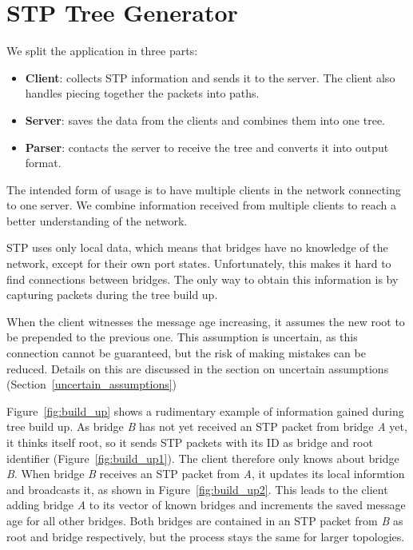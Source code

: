 \chapter{STP Tree Generator}
\label{stp-gen}
We split the application in three parts:
\begin{itemize}
    \item \textbf{Client}: collects STP information and sends it to the server.
        The client also handles piecing together the packets into paths.
    \item \textbf{Server}: saves the data from the clients and combines them into one tree.
    \item \textbf{Parser}: contacts the server to receive the tree and converts it into output format.
\end{itemize}
The intended form of usage is to have multiple clients in the network connecting to one server.
We combine information received from multiple clients to reach a better understanding of the network.

STP uses only local data, which means that bridges have no knowledge of the network, except for their own port states.
Unfortunately, this makes it hard to find connections between bridges.
The only way to obtain this information is by capturing packets during the tree build up.

When the client witnesses the message age increasing, it assumes the new root to be prepended to the previous one.
This assumption is uncertain, as this connection cannot be guaranteed, but the risk of making mistakes can be reduced.
Details on this are discussed in the section on uncertain assumptions (Section~\ref{uncertain_assumptions})

Figure~\ref{fig:build_up} shows a rudimentary example of information gained during tree build up.
As bridge \textit{B} has not yet received an STP packet from bridge \textit{A} yet, it thinks itself root, so it sends STP packets with its ID as bridge and root identifier (Figure~\ref{fig:build_up1}).
The client therefore only knows about bridge \textit{B}.
When bridge \textit{B} receives an STP packet from \textit{A}, it updates its local informtion and broadcasts it, as shown in Figure~\ref{fig:build_up2}.
This leads to the client adding bridge \textit{A} to its vector of known bridges and increments the saved message age for all other bridges.
Both bridges are contained in an STP packet from \textit{B} as root and bridge respectively, but the process stays the same for larger topologies.

